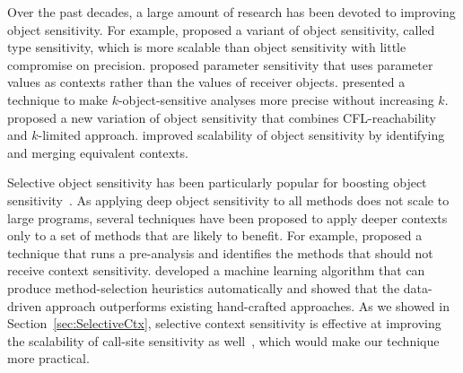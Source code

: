 Over the past decades, a large amount of  research
 has been devoted to improving object sensitivity.
For example, \cite{Smaragdakis2011} proposed a variant of object sensitivity, called type sensitivity, which is more scalable than object sensitivity with little compromise on precision.
\cite{SridharanDCST12} proposed parameter sensitivity that uses parameter values as contexts rather than the values of receiver objects.
\cite{TanLX16} presented a technique to make $k$-object-sensitive analyses more precise 
without increasing $k$.
\cite{Thiessen2017} proposed a new variation of object sensitivity
that combines CFL-reachability and $k$-limited approach. 
\cite{Xu2008} improved scalability of object sensitivity by identifying and merging equivalent contexts.


Selective object sensitivity has been particularly popular for boosting object 
sensitivity~\cite{Smaragdakis2014,Li2018a,Li2018b,JeJeChOh17,WeiR15,Liang2011,Liang2011learning,Lu:2019:PYF}.  As 
applying deep object sensitivity to
all methods does not scale to large programs, several techniques have
been proposed to apply deeper contexts only to a set of methods
that are likely to benefit.
For example, \cite{Smaragdakis2014} proposed a technique that runs a
pre-analysis and identifies the methods that should not receive
context sensitivity. \cite{JeJeChOh17} developed a machine learning
algorithm that can produce method-selection heuristics automatically
and showed that the data-driven approach outperforms existing
hand-crafted approaches. 
As we showed in Section~\ref{sec:SelectiveCtx}, selective context sensitivity is
effective at improving the scalability of call-site sensitivity as
well~\cite{Smaragdakis2014,Oh2014,ZipperJournal20}, which would make our 
technique more practical. 





